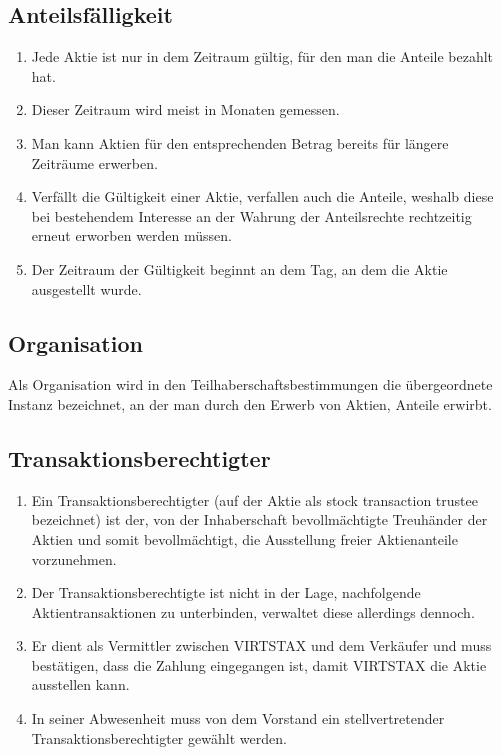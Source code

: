 \documentclass{article}
\begin{document}
\subsection{Anteilsfälligkeit}
\begin{enumerate}[(1)]
	\item Jede Aktie ist nur in dem Zeitraum gültig, für den man die Anteile bezahlt hat.
	\item Dieser Zeitraum wird meist in Monaten gemessen.
	\item Man kann Aktien für den entsprechenden Betrag bereits für längere Zeiträume erwerben.
	\item Verfällt die Gültigkeit einer Aktie, verfallen auch die Anteile, weshalb diese bei bestehendem Interesse an der Wahrung der Anteilsrechte rechtzeitig erneut erworben werden müssen.
	\item Der Zeitraum der Gültigkeit beginnt an dem Tag, an dem die Aktie ausgestellt wurde.
\end{enumerate}

\subsection{Organisation}
Als Organisation wird in den Teilhaberschaftsbestimmungen die übergeordnete Instanz bezeichnet, an der man durch den Erwerb von Aktien, Anteile erwirbt.

\subsection{Transaktionsberechtigter}
\begin{enumerate}[(1)]
	\item Ein Transaktionsberechtigter (auf der Aktie als stock transaction trustee bezeichnet) ist der, von der Inhaberschaft bevollmächtigte Treuhänder der Aktien und somit bevollmächtigt, die Ausstellung freier Aktienanteile vorzunehmen.
	\item Der Transaktionsberechtigte ist nicht in der Lage, nachfolgende Aktientransaktionen zu unterbinden, verwaltet diese allerdings dennoch.
	\item Er dient als Vermittler zwischen VIRTSTAX und dem Verkäufer und muss bestätigen, dass die Zahlung eingegangen ist, damit VIRTSTAX die Aktie ausstellen kann.
	\item In seiner Abwesenheit muss von dem Vorstand ein stellvertretender Transaktionsberechtigter gewählt werden.
\end{enumerate}
\end{document}
